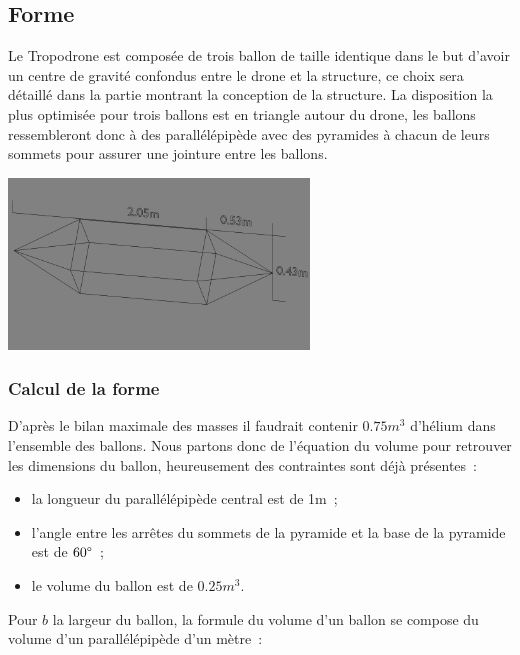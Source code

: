 \documentclass[a4paper,11pt]{article}
\begin{document}
\subsection{Forme}

Le Tropodrone est composée de trois ballon de taille identique dans le but d'avoir un centre de gravité confondus entre le drone et la structure, ce choix sera détaillé dans la partie montrant la conception de la structure.
La disposition la plus optimisée pour trois ballons est en triangle autour du drone, les ballons ressembleront donc à des parallélépipède avec des pyramides à chacun de leurs sommets pour assurer une jointure entre les ballons.

\begin{center}
 \includegraphics[width=8cm]{../Images/ballon.png}
\end{center}

\subsubsection{Calcul de la forme}

D'après le bilan maximale des masses il faudrait contenir $0.75m^3$ d'hélium dans l'ensemble des ballons. Nous partons donc de l'équation du volume pour retrouver les dimensions du ballon, heureusement des contraintes sont déjà présentes~:

\begin{itemize}
 \item la longueur du parallélépipède central est de 1m~;
 \item l'angle entre les arrêtes du sommets de la pyramide et la base de la pyramide est de $60 \degree$~;
 \item le volume du ballon est de $0.25m^3$.
\end{itemize}

\bigbreak

Pour $b$ la largeur du ballon, la formule du volume d'un ballon se compose du volume d'un parallélépipède d'un mètre~:

\begin{center}
\end{center}
\end{document}
